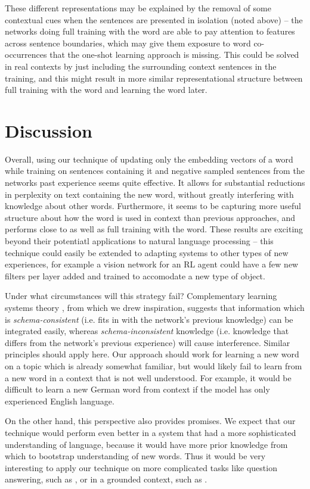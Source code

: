 \documentclass{article}
\begin{document}
These different representations may be explained by the removal of some contextual cues when the sentences are presented in isolation (noted above) -- the networks doing full training with the word are able to pay attention to features across sentence boundaries, which may give them exposure to word co-occurrences that the one-shot learning approach is missing. This could be solved in real contexts by just including the surrounding context sentences in the training, and this might result in more similar representational structure between full training with the word and learning the word later. \par
\section{Discussion}
Overall, using our technique of updating only the embedding vectors of a word while training on sentences containing it and negative sampled sentences from the networks past experience seems quite effective. It allows for substantial reductions in perplexity on text containing the new word, without greatly interfering with knowledge about other words. Furthermore, it seems to be capturing more useful structure about how the word is used in context than previous approaches, and performs close to as well as full training with the word. These results are exciting beyond their potentiatl applications to natural language processing -- this technique could easily be extended to adapting systems to other types of new experiences, for example a vision network for an RL agent could have a few new filters per layer added and trained to accomodate a new type of object. \par 
Under what circumstances will this strategy fail? Complementary learning systems theory \citep{Kumaran2016}, from which we drew inspiration, suggests that information which is \emph{schema-consistent} (i.e. fits in with the network's previous knowledge) can be integrated easily, whereas \emph{schema-inconsistent} knowledge (i.e. knowledge that differs from the network's previous experience) will cause interference. Similar principles should apply here. Our approach should work for learning a new word on a topic which is already somewhat familiar, but would likely fail to learn from a new word in a context that is not well understood. For example, it would be difficult to learn a new German word from context if the model has only experienced English language. \par  
On the other hand, this perspective also provides promises. We expect that our technique would perform even better in a system that had a more sophisticated understanding of language, because it would have more prior knowledge from which to bootstrap understanding of new words. Thus it would be very interesting to apply our technique on more complicated tasks like question answering, such as \citet{Santoro2017}, or in a grounded context, such as \citet{Hermann2017}. \par 
\end{document}
